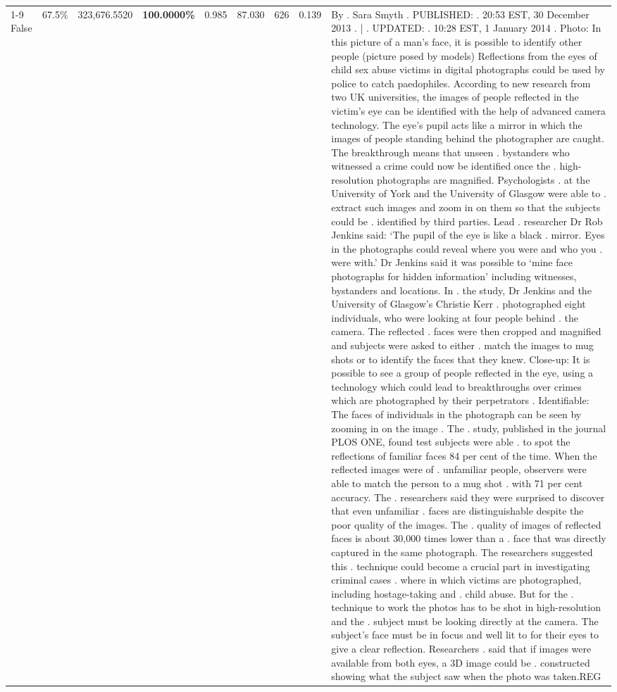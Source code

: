 \begin{table}[H]
\begin{tabular}{lllrlllll}
\cline{1-9} \cline{2-9}
False & 67.5\% & 323,676.5520 & \bfseries \color{red} 100.0000\% & 0.985 & 87.030 & 626 & 0.139 & By . Sara Smyth . PUBLISHED: . 20:53 EST, 30 December 2013 . | . UPDATED: . 10:28 EST, 1 January 2014 . Photo: In this picture of a man's face, it is possible to identify other people (picture posed by models) Reflections from the eyes of child sex abuse victims in digital photographs could be used by police to catch paedophiles. According to new research from two UK universities, the images of people reflected in the victim's eye can be identified with the help of advanced camera technology. The eye's pupil acts like a mirror in which the images of people standing behind the photographer are caught. The breakthrough means that unseen . bystanders who witnessed a crime could now be identified once the . high-resolution photographs are magnified. Psychologists . at the University of York and the University of Glasgow were able to . extract such images and zoom in on them so that the subjects could be . identified by third parties. Lead . researcher Dr Rob Jenkins said: ‘The pupil of the eye is like a black . mirror. Eyes in the photographs could reveal where you were and who you . were with.' Dr Jenkins said it was possible to ‘mine face photographs for hidden information' including witnesses, bystanders and locations. In . the study, Dr Jenkins and the University of Glasgow's Christie Kerr . photographed eight individuals, who were looking at four people behind . the camera. The reflected . faces were then cropped and magnified and subjects were asked to either . match the images to mug shots or to identify the faces that they knew. Close-up: It is possible to see a group of people reflected in the eye, using a technology which could lead to breakthroughs over crimes which are photographed by their perpetrators . Identifiable: The faces of individuals in the photograph can be seen by zooming in on the image . The . study, published in the journal PLOS ONE, found test subjects were able . to spot the reflections of familiar faces 84 per cent of the time. When the reflected images were of . unfamiliar people, observers were able to match the person to a mug shot . with 71 per cent accuracy. The . researchers said they were surprised to discover that even unfamiliar . faces are distinguishable despite the poor quality of the images. The . quality of images of reflected faces is about 30,000 times lower than a . face that was directly captured in the same photograph. The researchers suggested this . technique could become a crucial part in investigating criminal cases . where in which victims are photographed, including hostage-taking and . child abuse. But for the . technique to work the photos has to be shot in high-resolution and the . subject must be looking directly at the camera. The subject's face must be in focus and well lit to for their eyes to give a clear reflection. Researchers . said that if images were available from both eyes, a 3D image could be . constructed showing what the subject saw when the photo was taken.REG \\

\end{tabular}
\end{table}
